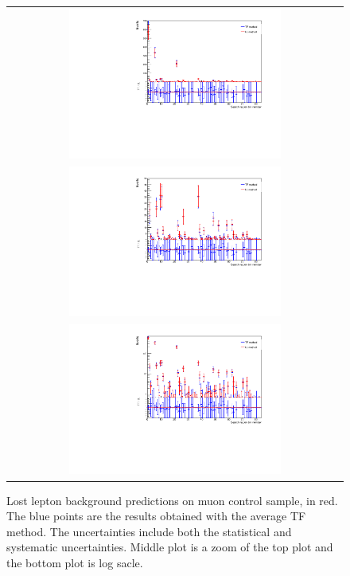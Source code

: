 \begin{figure}[hptb]
\begin{center}
\begin{tabular}{c}
\includegraphics[width=0.65\textwidth]{sections/mc4/Backgrounds/LostLepton/figures/v4_DataCardCampare_0_700_mu_cs.pdf}\\
\includegraphics[width=0.65\textwidth]{sections/mc4/Backgrounds/LostLepton/figures/v4_DataCardCampare_0_50_mu_cs.pdf}\\
\includegraphics[width=0.65\textwidth]{sections/mc4/Backgrounds/LostLepton/figures/v4_DataCardCampare_0_700_mu_cs_log.pdf}
\end{tabular}
\end{center}
\caption{Lost lepton background predictions on muon control sample, in red. The blue points are the results obtained with the average TF method. 
The uncertainties include both the statistical and systematic uncertainties. Middle plot is a zoom of the top plot and the bottom plot is log sacle.}
\label{fig:LostLeptonResult_mu}
\end{figure}

